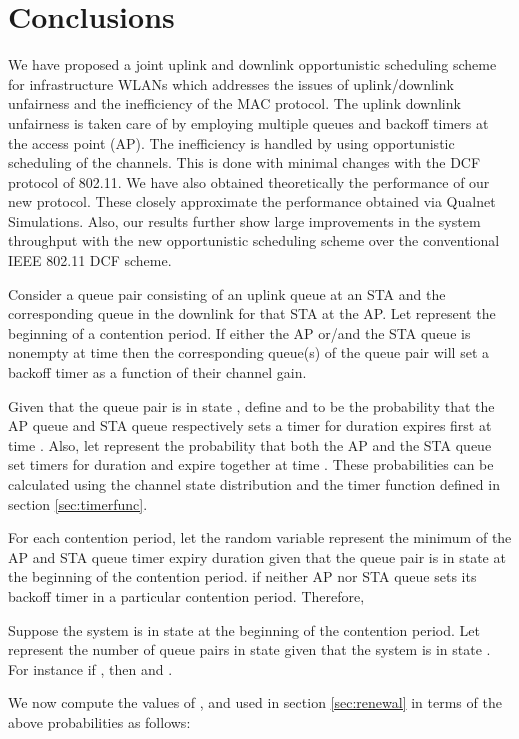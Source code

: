 \documentclass[10pt,conference]{IEEEtran}
\begin{document}
\section{Conclusions}
\label{sec:conclusion}
 We have proposed a joint uplink and downlink opportunistic scheduling scheme for infrastructure WLANs which addresses the issues of uplink/downlink unfairness and the inefficiency of the MAC protocol. 
The uplink downlink unfairness is taken care of by employing multiple queues and backoff timers at the access point (AP).
The inefficiency is handled by using opportunistic scheduling of the channels.
This is done with minimal changes with the DCF protocol of 802.11.
We have also obtained theoretically the performance of our new protocol.
These closely approximate the performance obtained via Qualnet Simulations.
Also, our results further show large improvements in the system throughput with the new opportunistic scheduling scheme over the conventional IEEE 802.11 DCF scheme.

\appendix
\label{app_oppsched1}
Consider a  queue pair consisting of an uplink queue at an STA and the corresponding queue in the downlink for that STA at the AP.
Let  represent the beginning of a contention period. 
If either the AP or/and the STA queue is nonempty  at time  then the corresponding queue(s) of the queue pair will set a backoff timer as a function of their channel gain.
 
Given that the queue pair is in state , define  and  to be the probability that the AP queue and STA queue respectively sets a timer for duration  expires first at time . 
Also, let  represent the probability that both the AP and the STA queue set timers for duration  and expire together at time .  
These probabilities can be calculated using the channel state distribution and the timer function defined in section \ref{sec:timerfunc}.

For each contention period, let the random variable   represent the minimum of the AP and STA queue timer expiry duration given that the queue pair is in state  at the beginning of the contention period.
 if neither AP nor STA queue sets its backoff timer in a particular contention period.
Therefore,


Suppose the system is in state  at the beginning of the contention period.
Let  represent the number of queue pairs in state  given that the system is in state . 
For instance if , then  and .

We now compute the values of ,  and  used in section \ref{sec:renewal} in terms of the above probabilities as follows:
\end{document}
